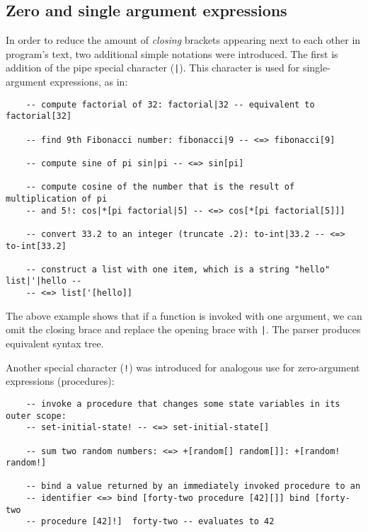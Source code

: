 \subsection{Zero and single argument expressions}
In order to reduce the amount of \textit{closing} brackets appearing next to
each other in program's text, two additional simple notations were
introduced. The first is addition of the pipe special character
(\texttt{|}). This character is used for single-argument expressions, as in:

\begin{lstlisting}
    -- compute factorial of 32: factorial|32 -- equivalent to factorial[32]
    
    -- find 9th Fibonacci number: fibonacci|9 -- <=> fibonacci[9]
    
    -- compute sine of pi sin|pi -- <=> sin[pi]
    
    -- compute cosine of the number that is the result of multiplication of pi
    -- and 5!: cos|*[pi factorial|5] -- <=> cos[*[pi factorial[5]]]
    
    -- convert 33.2 to an integer (truncate .2): to-int|33.2 -- <=> to-int[33.2]
    
    -- construct a list with one item, which is a string "hello" list|'|hello --
    -- <=> list['[hello]]
\end{lstlisting}

The above example shows that if a function is invoked with one argument, we can
omit the closing brace and replace the opening brace with \texttt{|}. The parser
produces equivalent syntax tree.

Another special character (\texttt{!}) was introduced for analogous use for
zero-argument expressions (procedures):
\begin{lstlisting}
    -- invoke a procedure that changes some state variables in its outer scope:
    -- set-initial-state! -- <=> set-initial-state[]
    
    -- sum two random numbers: <=> +[random[] random[]]: +[random! random!]
    
    -- bind a value returned by an immediately invoked procedure to an
    -- identifier <=> bind [forty-two procedure [42][]] bind [forty-two
    -- procedure [42]!]  forty-two -- evaluates to 42
\end{lstlisting}


